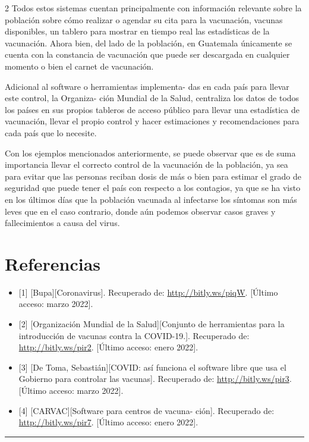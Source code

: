 \documentclass[12pt,spanish,Letterpaper,openany]{book}
\newcommand{\HRule}{\begin{center}\rule{0.5\linewidth}{0.2mm}\end{center}}
\begin{document}
\begin {multicols}{2}
Todos estos sistemas cuentan principalmente con información relevante sobre la población sobre cómo realizar o agendar su cita para la vacunación, vacunas disponibles, un tablero para mostrar en tiempo real las estadísticas de la vacunación. Ahora bien, del lado de la población, en Guatemala únicamente se cuenta con la constancia de vacunación que puede ser descargada en cualquier momento o bien el carnet de vacunación.

Adicional al software o herramientas implementa-
das en cada país para llevar este control, la Organiza-
ción Mundial de la Salud, centraliza los datos de todos los países en sus propios tableros de acceso público para llevar una estadística de vacunación, llevar el propio control y hacer estimaciones y recomendaciones para cada país que lo necesite.

Con los ejemplos mencionados anteriormente, se puede observar que es de suma importancia llevar el correcto control de la vacunación de la población, ya sea para evitar que las personas reciban dosis de más o bien para estimar el grado de seguridad que puede tener el país con respecto a los contagios, ya que se ha visto en los últimos días que la población vacunada al infectarse los síntomas son más leves que en el caso contrario, donde aún podemos observar casos graves y fallecimientos a causa del virus.

\hypertarget{referencias-16}{%
\section*{Referencias}\label{referencias-16}}

\begin{itemize}
\item
  {[}1{]} {[}Bupa{]}{[}Coronavirus{]}. Recuperado de: \url{http://bitly.ws/piqW}. {[}Último acceso: marzo 2022{]}.
\item
  {[}2{]} {[}Organización Mundial de la Salud{]}{[}Conjunto de herramientas para la introducción de vacunas contra la COVID-19.{]}. Recuperado de: \url{http://bitly.ws/pir2}. {[}Último acceso: enero 2022{]}.
\item
  {[}3{]} {[}De Toma, Sebastián{]}{[}COVID: así funciona el software libre que usa el Gobierno para controlar las vacunas{]}. Recuperado de: \url{http://bitly.ws/pir3}. {[}Último acceso: marzo 2022{]}.
\item
  {[}4{]} {[}CARVAC{]}{[}Software para centros de vacuna-
  ción{]}. Recuperado de: \url{http://bitly.ws/pir7}. {[}Último acceso: enero 2022{]}.
\end{itemize}

\end {multicols}
\medskip
\HRule
\medskip
\end{document}
